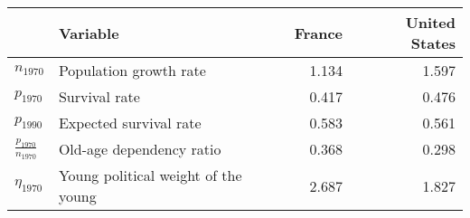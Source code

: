 
\begin{tabular}{llrr}
\toprule
\textbf{} & \textbf{Variable} & \textbf{France} & \textbf{United States}\\
\midrule
$n_{1970}$ & Population growth rate & 1.134 & 1.597\\
$p_{1970}$ & Survival rate & 0.417 & 0.476\\
$p_{1990}$ & Expected survival rate & 0.583 & 0.561\\
$\frac{p_{1970}}{n_{1970}}$ & Old-age dependency ratio & 0.368 & 0.298\\
$\eta_{1970}$ & Young political weight of the young & 2.687 & 1.827\\
\bottomrule
\end{tabular}
